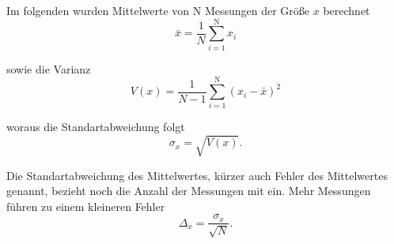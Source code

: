 Im folgenden wurden Mittelwerte von N Messungen der Größe $x$ berechnet
\begin {equation}
\bar{x} =  \frac{1}{N} \sum_{i=1}^\text{N} x_i
\end{equation}

sowie die Varianz
\begin {equation}
V(x) = \frac{1}{N-1} \sum_{i=1}^\text{N} (x_i - \bar{x})^2
\end{equation}

woraus die Standartabweichung folgt
\begin {equation}
\sigma_x = \sqrt{V(x)}.
\end{equation}

Die Standartabweichung des Mittelwertes, kürzer auch Fehler des Mittelwertes genannt, bezieht noch die Anzahl der Messungen mit ein. Mehr Messungen führen zu einem kleineren Fehler
\begin {equation}
\Delta_{x} = \frac{\sigma_x}{\sqrt{N}}.
\end{equation}
